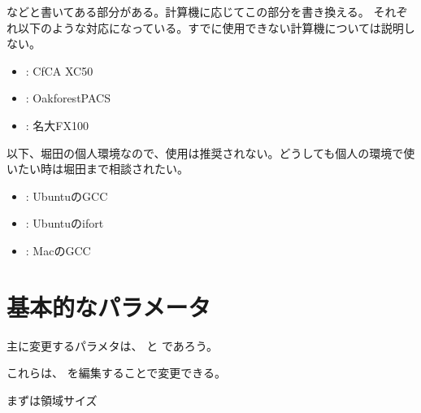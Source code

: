 \documentclass[letterpaper,10pt,dvipdfmx,report]{sphinxmanual}
\begin{document}
などと書いてある部分がある。計算機に応じてこの部分を書き換える。
それぞれ以下のような対応になっている。すでに使用できない計算機については説明しない。
\begin{itemize}
\item {} 
: CfCA XC50

\item {} 
: Oakforest\sphinxhyphen{}PACS

\item {} 
: 名大FX100

\end{itemize}

以下、堀田の個人環境なので、使用は推奨されない。どうしても個人の環境で使いたい時は堀田まで相談されたい。
\begin{itemize}
\item {} 
: UbuntuのGCC

\item {} 
: Ubuntuのifort

\item {} 
: MacのGCC

\end{itemize}


\section{基本的なパラメータ}
\label{\detokenize{start:id3}}
主に変更するパラメタは、 と  であろう。

これらは、 を編集することで変更できる。

まずは領域サイズ
\end{document}
